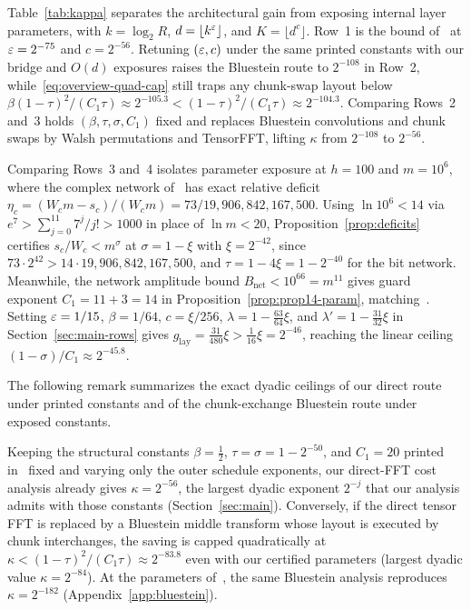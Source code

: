 Table~\ref{tab:kappa} separates the architectural gain from exposing internal layer parameters, with $k=\log_2 R$, $d=\lfloor k^\varepsilon\rfloor$, and $K=\lfloor d^c\rfloor$. Row~1 is the bound of~\cite{OAI26} at $\varepsilon=2^{-75}$ and $c=2^{-56}$. Retuning $(\varepsilon,c)$ under the same printed constants with our bridge and $O(d)$ exposures raises the Bluestein route to $2^{-108}$ in Row~2, while~\eqref{eq:overview-quad-cap} still traps any chunk-swap layout below $\beta(1-\tau)^2/(C_1\tau)\approx 2^{-105.3}<(1-\tau)^2/(C_1\tau)\approx 2^{-104.3}$. Comparing Rows~2 and~3 holds $(\beta,\tau,\sigma,C_1)$ fixed and replaces Bluestein convolutions and chunk swaps by Walsh permutations and \textsf{TensorFFT}, lifting $\kappa$ from $2^{-108}$ to $2^{-56}$.

Comparing Rows~3 and~4 isolates parameter exposure at $h=100$ and $m=10^6$, where the complex network of~\cite{OAI26} has exact relative deficit $\eta_c=(W_c m - s_c)/(W_c m)=73/19{,}906{,}842{,}167{,}500$. Using $\ln 10^6 < 14$ via $e^7>\sum_{j=0}^{11}7^j/j!>1000$ in place of $\ln m<20$, Proposition~\ref{prop:deficits} certifies $s_c/W_c < m^\sigma$ at $\sigma=1-\xi$ with $\xi=2^{-42}$, since $73\cdot 2^{42} > 14\cdot 19{,}906{,}842{,}167{,}500$, and $\tau=1-4\xi=1-2^{-40}$ for the bit network. Meanwhile, the network amplitude bound $B_{\mathrm{net}}<10^{66}=m^{11}$ gives guard exponent $C_1=11+3=14$ in Proposition~\ref{prop:prop14-param}, matching~\cite[\S5.4]{OAI26}. Setting $\varepsilon=1/15$, $\beta=1/64$, $c=\xi/256$, $\lambda=1-\frac{63}{64}\xi$, and $\lambda'=1-\frac{31}{32}\xi$ in Section~\ref{sec:main-rows} gives $g_{\mathrm{lay}}=\frac{31}{480}\xi > \frac{1}{16}\xi = 2^{-46}$, reaching the linear ceiling $(1-\sigma)/C_1\approx 2^{-45.8}$.

The following remark summarizes the exact dyadic ceilings of our direct route under printed constants and of the chunk-exchange Bluestein route under exposed constants.

\begin{remark}\label{rem:intro-printed}
Keeping the structural constants $\beta=\frac12$, $\tau=\sigma=1-2^{-50}$, and $C_1=20$ printed in~\cite[Prop.~14]{OAI26} fixed and varying only the outer schedule exponents, our direct-FFT cost analysis already gives $\kappa=2^{-56}$, the largest dyadic exponent $2^{-j}$ that our analysis admits with those constants (Section~\ref{sec:main}). Conversely, if the direct tensor FFT is replaced by a Bluestein middle transform whose layout is executed by chunk interchanges, the saving is capped quadratically at $\kappa<(1-\tau)^2/(C_1\tau)\approx 2^{-83.8}$ even with our certified parameters (largest dyadic value $\kappa=2^{-84}$). At the parameters of~\cite{OAI26}, the same Bluestein analysis reproduces $\kappa=2^{-182}$ (Appendix~\ref{app:bluestein}).
\end{remark}

